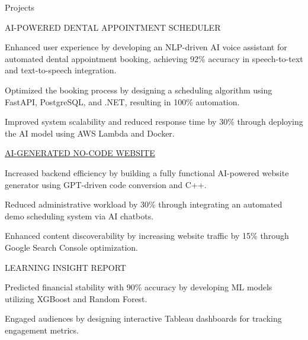 \documentclass{resume} %
\begin{document}
    \begin{rSection}{Projects}
                    \begin{rSubsection}
                                    {AI{-}POWERED DENTAL APPOINTMENT SCHEDULER}
                                {}{}{}
                                    \item Enhanced user experience by developing an NLP{-}driven AI voice assistant for automated dental appointment booking, achieving 92\% accuracy in speech{-}to{-}text and text{-}to{-}speech integration.
                                    \item Optimized the booking process by designing a scheduling algorithm using FastAPI, PostgreSQL, and .NET, resulting in 100\% automation.
                                    \item Improved system scalability and reduced response time by 30\% through deploying the AI model using AWS Lambda and Docker.
                            \end{rSubsection}
                    \begin{rSubsection}
                                    {\href{www.civaroai.com}{AI{-}GENERATED NO{-}CODE WEBSITE}}
                                {}{}{}
                                    \item Increased backend efficiency by building a fully functional AI{-}powered website generator using GPT{-}driven code conversion and C++.
                                    \item Reduced administrative workload by 30\% through integrating an automated demo scheduling system via AI chatbots.
                                    \item Enhanced content discoverability by increasing website traffic by 15\% through Google Search Console optimization.
                            \end{rSubsection}
                    \begin{rSubsection}
                                    {LEARNING INSIGHT REPORT}
                                {}{}{}
                                    \item Predicted financial stability with 90\% accuracy by developing ML models utilizing XGBoost and Random Forest.
                                    \item Engaged audiences by designing interactive Tableau dashboards for tracking engagement metrics.

\end{rSubsection}
\end{rSection}
\end{document}

